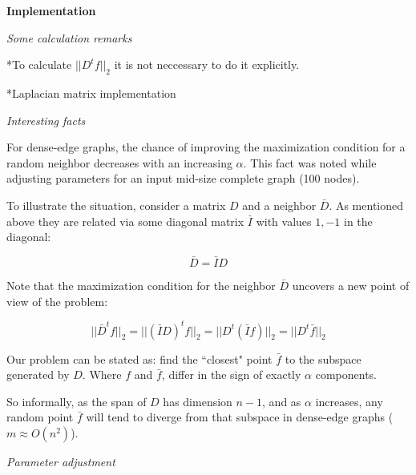 \documentclass[a4paper,11pt]{article}
\begin{document}
\bigskip

\textbf{Implementation}

\bigskip

\emph{Some calculation remarks}

\bigskip

*To calculate $||D^t f||_2$ it is not neccessary to do it explicitly.

*Laplacian matrix implementation

\bigskip

\emph{Interesting facts}

\bigskip

For dense-edge graphs, the chance of improving the maximization 
condition for a random neighbor decreases with an increasing $\alpha$. 
This fact was noted while adjusting parameters for an input mid-size 
complete graph (100 nodes). 

\bigskip

To illustrate the situation, consider a matrix $D$ and a neighbor 
$\bar{D}$. As mentioned above they are related via some diagonal matrix 
$\bar{I}$ with values $1,-1$ in the diagonal:

$$\bar{D} = \bar{I} D$$

Note that the maximization condition for the neighbor $\bar{D}$ uncovers 
a new point of view of the problem:

$$||\bar{D}^tf||_2 = ||(\bar{I} D)^t f||_2 = ||D^t (\bar{I} f)||_2 = 
||D^t \bar{f}||_2$$

Our problem can be stated as: find the ``closest" point $\bar{f}$ to 
the subspace generated by $D$. Where $f$ and $\bar{f}$, differ in the 
sign of exactly $\alpha$ components.

\bigskip

So informally, as the span of $D$ has dimension $n-1$, and as $\alpha$ 
increases, any random point $\bar{f}$ will tend to diverge from that 
subspace in dense-edge graphs ($m \approx O(n^2)$).

\bigskip

\emph{Parameter adjustment}

\bigskip
\end{document}
